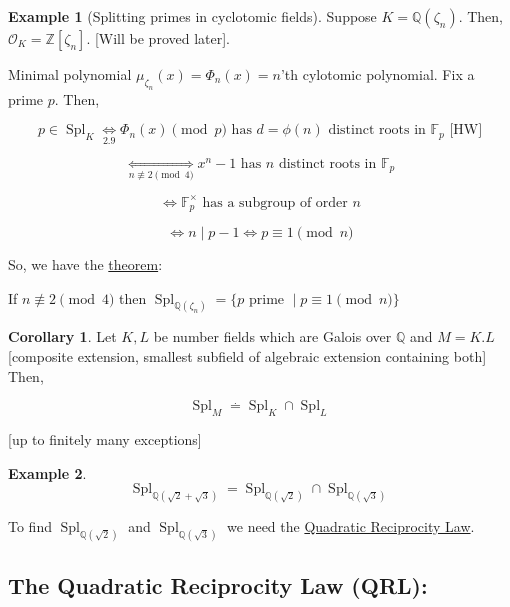 \documentclass[openany]{amsbook}
\numberwithin{section}{chapter}
\theoremstyle{definition}
\newtheorem*{example}{Example}
\newtheorem{corollary}[theorem]{Corollary}
\begin{document}
\begin{example}
    [Splitting primes in cyclotomic fields]

    Suppose \(K = \mathbb{Q} (\zeta _n)\). Then, \(\mathcal{O}_K = \mathbb{Z} [\zeta_n]\). [Will be proved later].

    Minimal polynomial \(\mu_{\zeta_n}(x) = \Phi_n(x) = n\)'th cylotomic polynomial. Fix a prime \(p\). Then,

    \[
        p \in \operatorname{Spl}_K \underset{2.9}{\iff} \Phi_n(x) \pmod p \text{ has } d = \phi(n) \text{ distinct roots in } \mathbb{F}_p \text{ [HW]}
    \]

    \[
        \underset{n\not\equiv 2 \pmod 4}{\iff} x^n - 1 \text{ has \(n\) distinct roots in } \mathbb{F} _p
    \]

    \[
        \iff \mathbb{F}_p^\times \text{ has a subgroup of order } n
    \]

    \[
        \iff n \mid p-1 \iff p \equiv 1\pmod n
    \]

    So, we have the \underline{theorem}:

    If \(n \not\equiv 2 \pmod 4\) then \(\operatorname{Spl}_{\mathbb{Q}(\zeta_n)} = \{ p \text{ prime } \mid p \equiv 1\pmod n \} \) 
\end{example}

\begin{corollary}
    Let \(K,L\) be number fields which are Galois over \(\mathbb{Q}\) and \(M = K . L\) [composite extension, smallest subfield of algebraic extension containing both] Then,

    \[
        \operatorname{Spl}_M \overset{.}{=} \operatorname{Spl}_K \cap \operatorname{Spl}_L
    \]

    [up to finitely many exceptions]
\end{corollary}

\begin{example}
    \[
        \operatorname{Spl}_{\mathbb{Q}(\sqrt{2} + \sqrt{3})} = \operatorname{Spl}_{\mathbb{Q}(\sqrt{2})} \cap \operatorname{Spl}_{\mathbb{Q}(\sqrt{3})}
    \]

    To find \(\operatorname{Spl}_{\mathbb{Q}(\sqrt{2})}\) and \(\operatorname{Spl}_{\mathbb{Q}(\sqrt{3})}\) we need the \underline{Quadratic Reciprocity Law}.
\end{example}

\subsection*{The Quadratic Reciprocity Law (QRL):}
\end{document}
